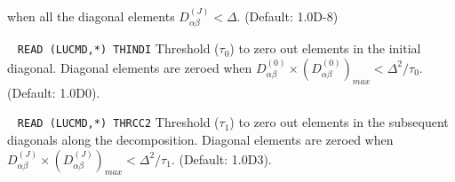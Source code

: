 \begin{description}
        when all the diagonal elements $D^{(J)}_{\alpha \beta} < \Delta$.
        (Default: 1.0D-8)
%
\item[\Key{THINDI}] \verb| |\newline
\verb|READ (LUCMD,*) THINDI|\newline
       Threshold ($\tau_0$) to zero out elements in the initial diagonal. 
        Diagonal elements are zeroed when 
       $D^{(0)}_{\alpha \beta} \times (D^{(0)}_{\alpha \beta})_{max} < \Delta^2/\tau_0$.
        (Default: 1.0D0).
%
\item[\Key{THSUDI}] \verb| |\newline
\verb|READ (LUCMD,*) THRCC2|\newline
       Threshold ($\tau_1$) to zero out elements in the subsequent diagonals along 
       the decomposition. Diagonal elements are zeroed when 
       $D^{(J)}_{\alpha \beta} \times (D^{(J)}_{\alpha \beta})_{max} < \Delta^2/\tau_1$.
        (Default: 1.0D3).
%
\end{description}
